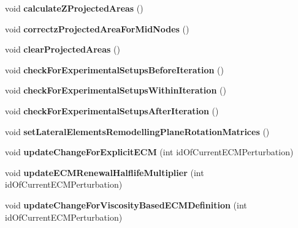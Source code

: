 \begin{DoxyCompactItemize}
\item 
\hypertarget{classSimulation_af21c5c157e6f487f879bdd7043288982}{}void {\bfseries calculate\+Z\+Projected\+Areas} ()\label{classSimulation_af21c5c157e6f487f879bdd7043288982}

\item 
\hypertarget{classSimulation_a7a47dfca0623a5636cb65416411cb901}{}void {\bfseries correctz\+Projected\+Area\+For\+Mid\+Nodes} ()\label{classSimulation_a7a47dfca0623a5636cb65416411cb901}

\item 
\hypertarget{classSimulation_a9c3f5acaa8ec130dedc94dfd6f7b013a}{}void {\bfseries clear\+Projected\+Areas} ()\label{classSimulation_a9c3f5acaa8ec130dedc94dfd6f7b013a}

\item 
\hypertarget{classSimulation_aa9ad0627365ad5d465b273183c7db344}{}void {\bfseries check\+For\+Experimental\+Setups\+Before\+Iteration} ()\label{classSimulation_aa9ad0627365ad5d465b273183c7db344}

\item 
\hypertarget{classSimulation_a2ebd37d36e25d118738d25811da4aa45}{}void {\bfseries check\+For\+Experimental\+Setups\+Within\+Iteration} ()\label{classSimulation_a2ebd37d36e25d118738d25811da4aa45}

\item 
\hypertarget{classSimulation_ae8b5dcc56bb2633d284a413f1e9dc1e9}{}void {\bfseries check\+For\+Experimental\+Setups\+After\+Iteration} ()\label{classSimulation_ae8b5dcc56bb2633d284a413f1e9dc1e9}

\item 
\hypertarget{classSimulation_ab28d554ccbe116e19e94345cb3233829}{}void {\bfseries set\+Lateral\+Elements\+Remodelling\+Plane\+Rotation\+Matrices} ()\label{classSimulation_ab28d554ccbe116e19e94345cb3233829}

\item 
\hypertarget{classSimulation_af0d9108d648996ef65a3eff0977a8590}{}void {\bfseries update\+Change\+For\+Explicit\+E\+C\+M} (int id\+Of\+Current\+E\+C\+M\+Perturbation)\label{classSimulation_af0d9108d648996ef65a3eff0977a8590}

\item 
\hypertarget{classSimulation_a2308c071a7f6260910d76d4a8604a0a3}{}void {\bfseries update\+E\+C\+M\+Renewal\+Halflife\+Multiplier} (int id\+Of\+Current\+E\+C\+M\+Perturbation)\label{classSimulation_a2308c071a7f6260910d76d4a8604a0a3}

\item 
\hypertarget{classSimulation_a6ac28dca8cca35baed5b75ce4f8062c8}{}void {\bfseries update\+Change\+For\+Viscosity\+Based\+E\+C\+M\+Definition} (int id\+Of\+Current\+E\+C\+M\+Perturbation)\label{classSimulation_a6ac28dca8cca35baed5b75ce4f8062c8}


\end{DoxyCompactItemize}
